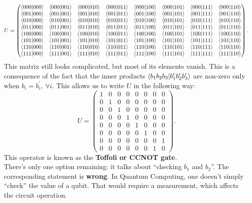 \documentclass[10pt]{article}
\begin{document}
\begin{equation}
U=
  \begin{pmatrix}
    \braket{000|000} & \braket{000|001} & \braket{000|010} & \braket{000|011} & \braket{000|100} & \braket{000|101} & \braket{000|111} & \braket{000|110}\\
    \braket{001|000} & \braket{001|001} & \braket{001|010} & \braket{001|011} & \braket{001|100} & \braket{001|101} & \braket{001|111} & \braket{001|110}\\
    \braket{010|000} & \braket{010|001} & \braket{010|010} & \braket{010|011} & \braket{010|100} & \braket{010|101} & \braket{010|111} & \braket{010|110}\\
    \braket{011|000} & \braket{011|001} & \braket{011|010} & \braket{011|011} & \braket{011|100} & \braket{011|101} & \braket{011|111} & \braket{011|110}\\
    \braket{100|000} & \braket{100|001} & \braket{100|010} & \braket{100|011} & \braket{100|100} & \braket{100|101} & \braket{100|111} & \braket{100|110}\\
    \braket{101|000} & \braket{101|001} & \braket{101|010} & \braket{101|011} & \braket{101|100} & \braket{101|101} & \braket{101|111} & \braket{101|110}\\
    \braket{110|000} & \braket{110|001} & \braket{110|010} & \braket{110|011} & \braket{110|100} & \braket{110|101} & \braket{110|111} & \braket{110|110}\\
    \braket{111|000} & \braket{111|001} & \braket{111|010} & \braket{111|011} & \braket{111|100} & \braket{111|101} & \braket{111|111} & \braket{111|110}
  \end{pmatrix}.
\end{equation}
This matrix still looks complicated, but most of its elements vanish. This is a
consequence of the fact that the inner products
\(\braket{b_1b_2b_3|b_{1}^{\prime}b_{2}^{\prime}b_{3}^{\prime}}\)
are non-zero only when \(b_i=b_{i}^{\prime},\:\forall i\). This allows us to
write \(U\) in the following way:
\begin{equation}
U=
  \begin{pmatrix}
    1 & 0 & 0 & 0 & 0 & 0 & 0 & 0\\
    0 & 1 & 0 & 0 & 0 & 0 & 0 & 0\\
    0 & 0 & 1 & 0 & 0 & 0 & 0 & 0\\
    0 & 0 & 0 & 1 & 0 & 0 & 0 & 0\\
    0 & 0 & 0 & 0 & 1 & 0 & 0 & 0\\
    0 & 0 & 0 & 0 & 0 & 1 & 0 & 0\\
    0 & 0 & 0 & 0 & 0 & 0 & 0 & 1\\
    0 & 0 & 0 & 0 & 0 & 0 & 1 & 0
  \end{pmatrix}.
\end{equation}
This operator is known as the \textbf{Toffoli or CCNOT gate}.\\
There's only one option remaining: it talks about ``checking \(b_1\) and \(b_2\)''.
The corresponding statement is \textbf{wrong}. In Quantum Computing, one doesn't simply
``check'' the value of a qubit. That would require a measurement, which affects
the circuit operation.
\end{document}
